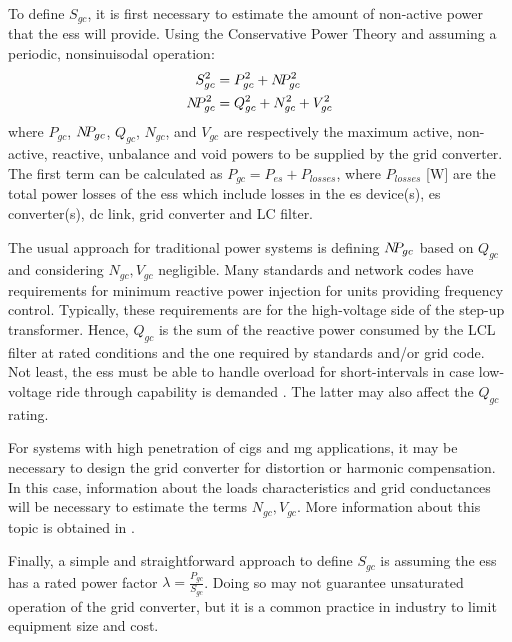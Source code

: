\documentclass[utf8]{frontiersSCNS} %
\begin{document}
To define $S_{gc}$, it is first necessary to estimate the amount of non-active power that the \gls{ess} will provide. Using the Conservative Power Theory \citep{tentiConservativePowerTheory2011} and assuming a periodic, nonsinuisodal operation:
\begin{align}
    S_{gc}^2 &= P_{gc}^2 + N \mkern-5mu P_{gc}^2 \\ 
    N \mkern-5mu P_{gc}^2 &= Q_{gc}^2 + N_{gc}^2 + V_{gc}^2 
\end{align}
where $P_{gc}$, $N \mkern-5mu P_{gc}$, $Q_{gc}$, $N_{gc}$, and $V_{gc}$ are respectively the maximum active, non-active, reactive, unbalance and void powers to be supplied by the grid converter. The first term can be calculated as $ P_{gc} = P_{es} + P_{losses} $, where $P_{losses}$ [$\si{\watt}$] are the total power losses of the \gls{ess} which include losses in the \gls{es} device(s), \gls{es} converter(s), dc link, grid converter and LC filter.

The usual approach for traditional power systems is defining $N \mkern-5mu P_{gc}$ based on $Q_{gc}$ and considering $N_{gc}, V_{gc}$ negligible. Many standards and network codes have requirements for minimum reactive power injection \citep{IEEEStd154720182018, comissionregulationeuNetworkCodeRequirements2016} for units providing frequency control. Typically, these requirements are for the high-voltage side of the step-up transformer. Hence, $Q_{gc}$ is the sum of the reactive power consumed by the LCL filter at rated conditions and the one required by standards and/or grid code. Not least, the \gls{ess} must be able to handle overload for short-intervals in case low-voltage ride through capability is demanded \citep{comissionregulationeuNetworkCodeRequirements2016,IEEEStd154720182018}. The latter may also affect the $Q_{gc}$ rating.  

For systems with high penetration of \glspl{cig} and \gls{mg} applications, it may be necessary to design the grid converter for distortion or harmonic compensation. In this case, information about the loads characteristics and grid conductances will be necessary to estimate the terms $N_{gc}, V_{gc}$. More information about this topic is obtained in \cite{tentiLoadCharacterizationRevenue2014}.

Finally, a simple and straightforward approach to define $S_{gc}$ is assuming the \gls{ess} has a rated power factor $ \lambda = \frac{P_{gc}}{S_{gc}}$. Doing so may not guarantee unsaturated operation of the grid converter, but it is a common practice in industry to limit equipment size and cost. 
\end{document}
